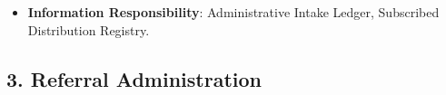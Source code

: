 \begin{itemize}
\begin{itemize}
\begin{itemize}
\item
\emph{Exposed Service}: \texttt{} — Emits change notifications across the HIE.



\end{itemize}


\end{itemize}


\item
\textbf{Information Responsibility}: Administrative Intake Ledger, Subscribed Distribution Registry.



\end{itemize}
\label{rad:sa:25}

\par\smallskip
{}\label{rad:sa:27}
\subsection*{3. Referral Administration}
\label{rad:sa:28}


